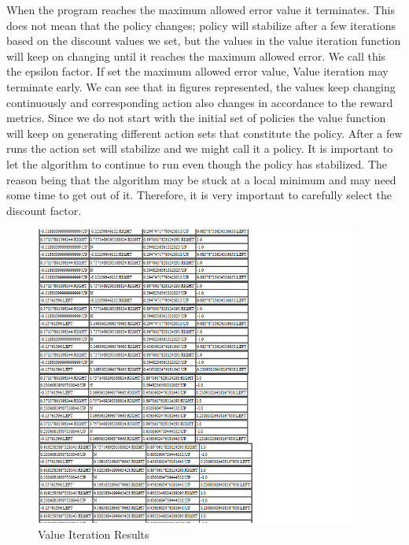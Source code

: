 When the program reaches the maximum allowed error value it terminates. This
does not mean that the policy changes; policy will stabilize after a few
iterations based on the discount values we set, but the values in the value
iteration function will keep on changing until it reaches the maximum allowed
error. We call this the epsilon factor. If set the maximum allowed error value,
Value iteration may terminate early.
 We can see that in figures
represented, the values keep changing continuously and corresponding action also
changes in accordance to the reward metrics. Since we do not start with the
initial set of policies the value function will keep on generating different
action sets that constitute the policy. After a few runs the action set will
stabilize and we might call it a policy. It is important to let the
algorithm to continue to run even though the policy has stabilized. The reason
being that the algorithm may be stuck at a local minimum and may need some time
to get out of it.  Therefore, it is very important to carefully select the
discount factor.

\begin{figure}[h!]
    \label{fig:ValueIterationResults2}
    \begin{center}
        \includegraphics[width=0.95\textwidth]{Figures/Planning_Figure_3.png}
        \caption{Value Iteration Results}
    \end{center}
\end{figure}

